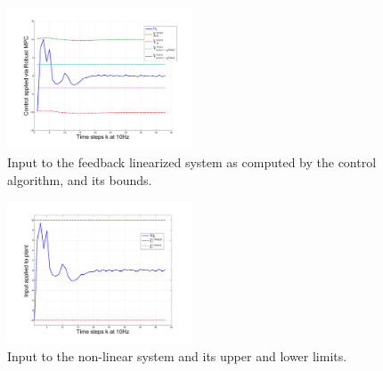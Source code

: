 \begin{figure}
\includegraphics[width=0.49\textwidth]{figs/v_and_limits_manip.pdf}
\caption{Input to the feedback linearized system as computed by the control algorithm, and its bounds.}
\label{fig:v_and_limits}
\end{figure}

\begin{figure}
\includegraphics[width=0.49\textwidth]{figs/u_and_limits_manip.pdf}
\caption{Input to the non-linear system and its upper and lower limits.}
\label{fig:u_and_limits}
\end{figure}


